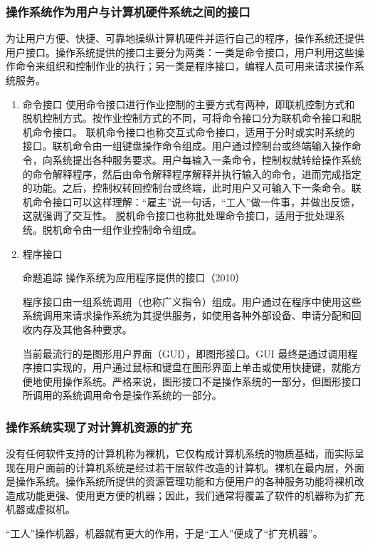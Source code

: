 \documentclass{ctexbook}
\begin{document}
	\subsubsection{操作系统作为用户与计算机硬件系统之间的接口}
	为让用户方便、快捷、可靠地操纵计算机硬件并运行自己的程序，操作系统还提供用户接口。操作系统提供的接口主要分为两类：一类是命令接口，用户利用这些操作命令来组织和控制作业的执行；另一类是程序接口，编程人员可用来请求操作系统服务。
	\begin{enumerate}
		\item 命令接口
		使用命令接口进行作业控制的主要方式有两种，即联机控制方式和脱机控制方式。按作业控制方式的不同，可将命令接口分为联机命令接口和脱机命令接口。
		联机命令接口也称交互式命令接口，适用于分时或实时系统的接口。联机命令由一组键盘操作命令组成。用户通过控制台或终端输入操作命令，向系统提出各种服务要求。用户每输入一条命令，控制权就转给操作系统的命令解释程序，然后由命令解释程序解释并执行输入的命令，进而完成指定的功能。之后，控制权转回控制台或终端，此时用户又可输入下一条命令。联机命令接口可以这样理解：“雇主”说一句话，“工人”做一件事，并做出反馈，这就强调了交互性。
		脱机命令接口也称批处理命令接口，适用于批处理系统。脱机命令由一组作业控制命令组成。

		\setcounter{enumi}{1}
		\item 程序接口
		
		\colorbox{gray!20}{命题追踪 \enspace 操作系统为应用程序提供的接口（2010）}
		
		程序接口由一组系统调用（也称广义指令）组成。用户通过在程序中使用这些系统调用来请求操作系统为其提供服务，如使用各种外部设备、申请分配和回收内存及其他各种要求。
		
		当前最流行的是图形用户界面（GUI），即图形接口。GUI 最终是通过调用程序接口实现的，用户通过鼠标和键盘在图形界面上单击或使用快捷键，就能方便地使用操作系统。严格来说，图形接口不是操作系统的一部分，但图形接口所调用的系统调用命令是操作系统的一部分。
	\end{enumerate}
	
	\subsubsection{操作系统实现了对计算机资源的扩充}
	没有任何软件支持的计算机称为裸机，它仅构成计算机系统的物质基础，而实际呈现在用户面前的计算机系统是经过若干层软件改造的计算机。裸机在最内层，外面是操作系统。操作系统所提供的资源管理功能和方便用户的各种服务功能将裸机改造成功能更强、使用更方便的机器；因此，我们通常将覆盖了软件的机器称为扩充机器或虚拟机。
	
	“工人”操作机器，机器就有更大的作用，于是“工人”便成了“扩充机器”。
	
\end{document}
